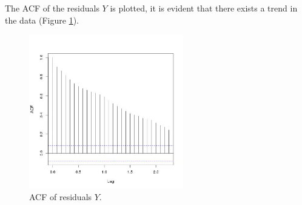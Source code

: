 \documentclass[a4paper]{article}
\begin{document}
The ACF of the residuals $Y$ is plotted, it is evident that there exists a trend in the data (Figure \ref{fig:plot_residual_acf}).

\begin{figure} [H]
	\centering
	\includegraphics[width=0.6\textwidth]{plot_residual_acf}
	\caption{ACF of residuals $Y$.}
	\label{fig:plot_residual_acf}
\end{figure}
\end{document}
